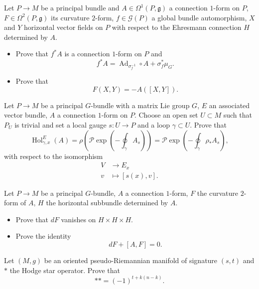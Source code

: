 \begin{exercise}
    Let $P \rightarrow M$ be a principal bundle 
    and $A \in \Omega^{1}(P, \mathfrak{g})$ a connection $1$-form on $P$, 
    $F \in \Omega^{2}(P, \mathfrak{g})$ its curvature $2$-form, 
    $f \in \mathscr{G}(P)$ a global bundle automorphism, 
    $X$ and $Y$ horizontal vector fields on $P$ with respect to the Ehresmann connection $H$ determined by $A$.
    \begin{itemize}
    \item Prove that $f^{*} A$ is a connection $1$-form on $P$ and
    $$f^{*} A=\operatorname{Ad}_{\sigma_{f}^{-1}} \circ A+\sigma_{f}^{*} \mu_{G}.$$
    \item Prove that
    $$F(X, Y)=-A([X, Y]).$$
    \end{itemize}
\end{exercise}

\begin{exercise}
    Let $P \rightarrow M$ be a principal $G$-bundle with a matrix Lie group $G$, 
    $E$ an associated vector bundle, $A$ a connection $1$-form on $P$. 
    Choose an open set $U \subset M$ such that $P_{U}$ is trivial 
    and set a local gauge $s: U \rightarrow P$ and a loop $\gamma \subset U$. Prove that
    $$\operatorname{Hol}_{\gamma, x}^{E}(A)
    =\rho\left(\mathscr{P} \exp \left(-\oint_{\gamma} A_{s}\right)\right)
    =\mathscr{P} \exp \left(-\oint_{\gamma} \rho_{*} A_{s}\right),$$
    with respect to the isomorphism
    \begin{align*}
    V & \longrightarrow E_{x} \\
    v & \longmapsto[s(x), v] .
    \end{align*}
\end{exercise}

\begin{exercise}
    Let $P \rightarrow M$ be a principal $G$-bundle, 
    $A$ a connection $1$-form, $F$ the curvature $2$-form of $A$, 
    $H$ the horizontal subbundle determined by $A$.
    \begin{itemize}
    \item Prove that $d F$ vanishes on $H \times H \times H$.
    \item Prove the identity
    $$d F+[A, F]=0 .$$
    \end{itemize}
\end{exercise}

\begin{exercise}
    Let $(M, g)$ be an oriented pseudo-Riemannian manifold of signature $(s, t)$ 
    and $*$ the Hodge star operator. Prove that
    $$** =(-1)^{t+k(n-k)}.$$
\end{exercise}

